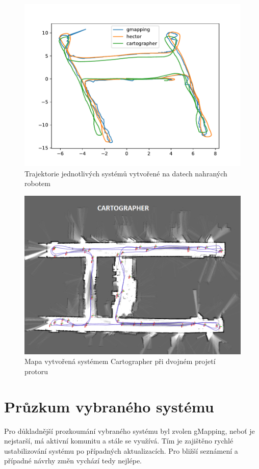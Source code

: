\documentclass[12pt]{report}
\begin{document}
\begin{figure}[!ht]
	\begin{center}
		\includegraphics[width=0.7\columnwidth]{imgs/robot_trajectory.pdf}
	\end{center}
	\caption{Trajektorie jednotlivých systémů vytvořené na datech nahraných robotem}
	\label{fig:robot_trajectory}
\end{figure}

\begin{figure}[!ht]
	\begin{center}
		\includegraphics[width=0.6\columnwidth]{imgs/Maps/Robot/5patrodvakrat_cart_traj.png}
	\end{center}
	\caption{Mapa vytvořená systémem Cartographer při dvojném projetí protoru}
	\label{fig:mapa_robot_cartographer_dvakrat}
\end{figure}

\newpage

\chapter{Průzkum vybraného systému}
Pro důkladnější prozkoumání vybraného systému byl zvolen gMapping, neboť je nejstarší, má aktivní komunitu a stále se využívá. Tím je zajištěno rychlé ustabilizování systému po případných aktualizacích. Pro bližší seznámení a případné návrhy změn vychází tedy nejlépe.
\end{document}
